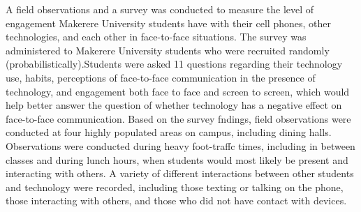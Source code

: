 \documentclass[11pt]{article} %
\begin{document}
A field observations and a survey was conducted to measure the level of engagement Makerere University students have with their cell phones, other technologies, and each other in face-to-face situations. 
The survey was administered to Makerere University students who were recruited randomly (probabilistically).Students were asked 11 questions regarding their technology use, habits, perceptions of face-to-face communication in the presence of technology, and engagement both face to face and screen to screen, which would help better answer the question of whether technology has a negative effect on face-to-face communication.
Based on the survey fndings, field observations were conducted at four highly populated areas on campus, including dining halls. Observations were conducted during heavy foot-traffc times, including in between classes and during lunch hours, when students would most likely be present and interacting with others. A variety of different interactions between other students and technology were recorded, including those texting or talking on the phone, those interacting with others, and those who did not have contact with 
devices. 
\end{document}
